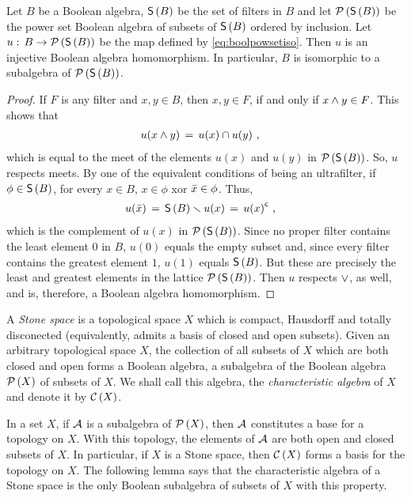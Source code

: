 \begin{thmBoolPowsetIso}\label{thm:boolpowsetiso}
	Let $B$ be a Boolean algebra, $\ufilters{B}$ be the set of filters
	in $B$ and let $\powset{\ufilters{B}}$ be the power set Boolean
	algebra of subsets of $\ufilters{B}$ ordered by inclusion. Let
	$u:\,B\rightarrow\powset{\ufilters{B}}$ be the map defined by
	\eqref{eq:boolpowsetiso}. Then $u$ is an injective Boolean algebra
	homomorphism. In particular, $B$ is isomorphic to a subalgebra of
	$\powset{\ufilters{B}}$.
\end{thmBoolPowsetIso}

\begin{proof}
	If $F$ is any filter and $x,y\in B$, then $x,y\in F$, if and only
	if $x\boolprod y\in F$. This shows that
	\begin{align*}
		u(x\boolprod y) & \,=\,u(x)\cap u(y)
		\text{ ,}
	\end{align*}
	which is equal to the meet of the elements $u(x)$ and $u(y)$
	in $\powset{\ufilters{B}}$. So, $u$ respects meets. By one of
	the equivalent conditions of being an ultrafilter, if
	$\phi\in\ufilters{B}$, for every $x\in B$, $x\in\phi$ xor
	$\conj{x}\in\phi$. Thus,
	\begin{align*}
		u(\conj{x}) & \,=\,\ufilters{B}\setmin u(x)
			\,=\,\setcomp{u(x)}
		\text{ ,}
	\end{align*}
	which is the complement of $u(x)$ in $\powset{\ufilters{B}}$.
	Since no proper filter contains the least element $0$ in $B$,
	$u(0)$ equals the empty subset and, since every filter contains the
	greatest element $1$, $u(1)$ equals $\ufilters{B}$. But these are
	precisely the least and greatest elements in the lattice
	$\powset{\ufilters{B}}$. Then $u$ respects $\boolsum$, as
	well, and is, therefore, a Boolean algebra homomorphism.
\end{proof}

A \emph{Stone space} is a topological space $X$ which is compact, Hausdorff
and totally disconected (equivalently, admits a basis of closed and open
subsets). Given an arbitrary topological space $X$, the collection of all
subsets of $X$ which are both closed and open forms a Boolean algebra, a
subalgebra of the Boolean algebra $\powset{X}$ of subsets of $X$. We shall
call this algebra, the \emph{characteristic algebra} of $X$ and denote it
by $\charalg{X}$.

In a set $X$, if $\cal{A}$ is a subalgebra of $\powset{X}$, then $\cal{A}$
constitutes a base for a topology on $X$. With this topology, the elements of
$\cal{A}$ are both open and closed subsets of $X$. In particular, if $X$ is a
Stone space, then $\charalg{X}$ forms a basis for the topology on $X$. The
following lemma says that the characteristic algebra of a Stone space is
the only Boolean subalgebra of subsets of $X$ with this property.

